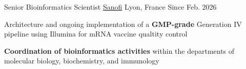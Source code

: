 

\begin{cventries}

 \cventry
    {Senior Bioinformatics Scientist} %
    {\href{https://www.sanofi.com/en}{Sanofi}} %
    {Lyon, France} %
    {Since Feb. 2026} %
    {
      \begin{cvitems} %
        \item {Architecture and ongoing implementation of a \textbf{GMP-grade} Generation IV pipeline using Illumina for mRNA vaccine qualtity control}
        \item {\textbf{Coordination of bioinformatics activities} within the departments of molecular biology, biochemistry, and immunology}
      \end{cvitems}
    }


\end{cventries}
